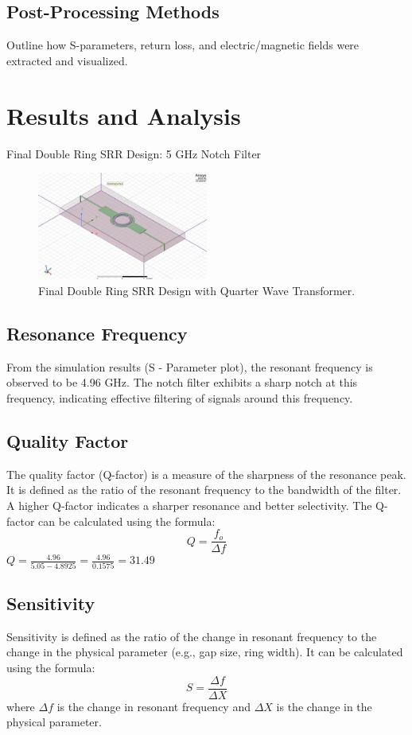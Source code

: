 \documentclass[conference]{IEEEtran}
\begin{document}
\subsection{Post-Processing Methods}
Outline how S-parameters, return loss, and electric/magnetic fields were extracted and visualized.

\section{Results and Analysis}
Final Double Ring SRR Design: 5 GHz Notch Filter
\begin{figure}[h]
\centering
    \includegraphics[width=0.5\textwidth]{Images/final_double_ring_srr.jpg}
    \caption{Final Double Ring SRR Design with Quarter Wave Transformer.}
\end{figure}
\subsection{Resonance Frequency}

From the simulation results (S - Parameter plot), the resonant frequency is observed to be 4.96 GHz. The notch filter exhibits a sharp notch at this frequency, indicating effective filtering of signals around this frequency.

\subsection{Quality Factor}
The quality factor (Q-factor) is a measure of the sharpness of the resonance peak. It is defined as the ratio of the resonant frequency to the bandwidth of the filter. A higher Q-factor indicates a sharper resonance and better selectivity. The Q-factor can be calculated using the formula:
\begin{equation}        
    Q = \frac{f_o}{\Delta f}
\end{equation}
$Q = \frac{4.96}{5.05-4.8925} = \frac{4.96}{0.1575} = 31.49$

\subsection{Sensitivity}
Sensitivity is defined as the ratio of the change in resonant frequency to the change in the physical parameter (e.g., gap size, ring width). It can be calculated using the formula:
\begin{equation}        
    S = \frac{\Delta f}{\Delta X}
\end{equation}
where \( \Delta f \) is the change in resonant frequency and \( \Delta X \) is the change in the physical parameter.\\
\end{document}
